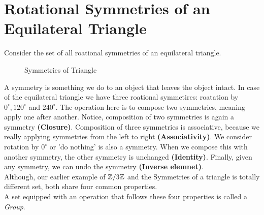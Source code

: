 \section{Rotational Symmetries of an Equilateral Triangle}
Consider the set of all roational symmetries of an equilateral triangle.
\begin{figure}[H]
    \centering
    \caption{Symmetries of Triangle}
    \label{fig:symmetries-of-triangle}
\end{figure}
A symmetry is something we do to an object that leaves the object intact. In case of the equilateral triangle we have three roational symmetires: roatation by $0^{\circ}, 120^{\circ}$ and $240^{\circ}$. The operation here is to compose two symmetries, meaning apply one after another. Notice, composition of two symmetries is again a symmetry \textbf{(Closure)}. Composition of three symmetries is associative, because we really applying symmetries from the left to right \textbf{(Associativity)}. We consider rotation by $0^{\circ}$ or 'do nothing' is also a symmetry. When we compose  this with another symmetry, the other symmetry is unchanged \textbf{(Identity)}. Finally, given any symmetry, we can undo the symmetry \textbf{(Inverse elemnet)}.\\
Although, our earlier example of $\mathbb{Z}/3\mathbb{Z}$ and the Symmetries of a triangle is totally different set, both share four common properties.\\
A set equipped with an operation that follows these four properties is called a \textit{Group}.
